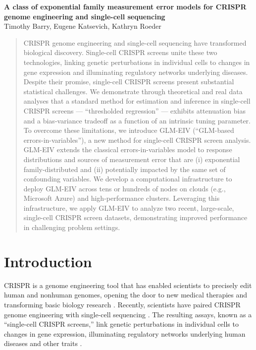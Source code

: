 \documentclass[11pt]{article}
\begin{document}
\noindent
\begin{center} 
\textbf{A class of exponential family measurement error models for CRISPR genome engineering and single-cell sequencing} \\
Timothy Barry, Eugene Katsevich, Kathryn Roeder
\end{center}

\begin{abstract}
CRISPR genome engineering and single-cell sequencing have transformed biological discovery. Single-cell CRISPR screens unite these two technologies, linking genetic perturbations in individual cells to changes in gene expression and illuminating regulatory networks underlying diseases. Despite their promise, single-cell CRISPR screens present substantial statistical challenges. We demonstrate through theoretical and real data analyses that a standard method for estimation and inference in single-cell CRISPR screens — “thresholded regression” — exhibits attenuation bias and a bias-variance tradeoff as a function of an intrinsic tuning parameter. To overcome these limitations, we introduce GLM-EIV (``GLM-based errors-in-variables''), a new method for single-cell CRISPR screen analysis. GLM-EIV extends the classical errors-in-variables model to response distributions and sources of measurement error that are (i) exponential family-distributed and (ii) potentially impacted by the same set of confounding variables. We develop a computational infrastructure to deploy GLM-EIV across tens or hundreds of nodes on clouds (e.g., Microsoft Azure) and high-performance clusters. Leveraging this infrastructure, we apply GLM-EIV to analyze two recent, large-scale, single-cell CRISPR screen datasets, demonstrating improved performance in challenging problem settings.
\end{abstract}

\section{Introduction}
CRISPR is a genome engineering tool that has enabled scientists to precisely edit human and nonhuman genomes, opening the door to new medical therapies \cite{Rothgangl2021,Musunuru2021} and transforming basic biology research \cite{Przybyla2021}. Recently, scientists have paired CRISPR genome engineering with single-cell sequencing \cite{Dixit2016,Datlinger2017}. The resulting assays, known as a ``single-cell CRISPR screens,'' link genetic perturbations in individual cells to changes in gene expression, illuminating regulatory networks underlying human diseases and other traits \cite{Morris2021a}.
\end{document}
